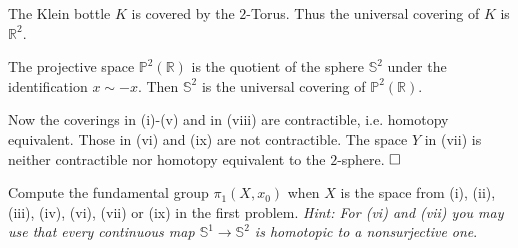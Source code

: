\documentclass[11pt]{book}
\numberwithin{dummy}{section}
\theoremstyle{nonumberbreak}
\newenvironment{sol}[1][]{\ifthenelse{\equal{#1}{}}{\solution}{\solution[#1]}\rm}{\endsolution}
\newenvironment{prob}[1][]{\ifthenelse{\equal{#1}{}}{\problem}{\problem[#1]}\rm}{\endproblem}
\newcommand{\la}{\longrightarrow}
\begin{document}
\begin{spacing}{1.4}
\begin{prob}
\begin{sol}
\begin{compactenum}
\item The Klein bottle $K$ is covered by the $2$-Torus. Thus the universal covering of $K$ is $\mathbb{R}^2$.
\item The projective space $\mathbb{P}^2(\mathbb{R})$ is the quotient of the sphere $\mathbb{S}^2$ under the identification $x \sim -x$. Then $\mathbb{S}^2$ is the universal covering of $\mathbb{P}	^2(\mathbb{R})$.

\end{compactenum}
Now the coverings in (i)-(v) and in (viii) are contractible, i.e. homotopy equivalent. Those in (vi) and (ix) are not contractible. The space $Y$ in (vii) is neither contractible nor homotopy equivalent to the $2$-sphere. $\hfill \Box$
\end{sol}



\end{prob}    %


\begin{prob} Compute the fundamental group $\pi_1(X,x_0)$ when $X$ is the space from (i), (ii), (iii), (iv), (vi), (vii) or (ix) in the first problem. \textit{Hint: For (vi) and (vii) you may use that every continuous map $\mathbb{S}^1 \la \mathbb{S}^2$ is homotopic to a nonsurjective one}.


\end{prob}
\end{spacing}
\end{document}
